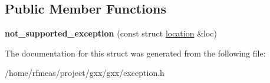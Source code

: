 \subsection*{Public Member Functions}
\begin{DoxyCompactItemize}
\item 
{\bfseries not\+\_\+supported\+\_\+exception} (const struct \hyperlink{structlocation}{location} \&loc)\hypertarget{structgxx_1_1not__supported__exception_ad54b67d66699d651d3dcf1c422ca765e}{}\label{structgxx_1_1not__supported__exception_ad54b67d66699d651d3dcf1c422ca765e}

\end{DoxyCompactItemize}


The documentation for this struct was generated from the following file\+:\begin{DoxyCompactItemize}
\item 
/home/rfmeas/project/gxx/gxx/exception.\+h\end{DoxyCompactItemize}
